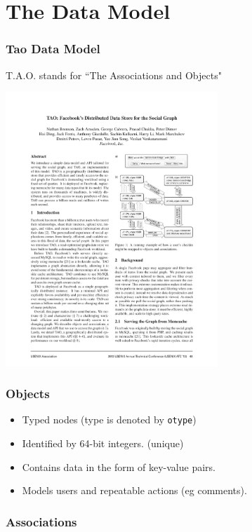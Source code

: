 \section{The Data Model}

\begin{frame}
\frametitle{Tao Data Model}
 	T.A.O. stands for ``The Associations and Objects"
 	\begin{center}
 	\includegraphics[width=0.6\textwidth]{figs/social2}		
 	\end{center}
\end{frame}

\begin{frame}[fragile]
\frametitle{Objects}
   
\begin{itemize}
	\item Typed nodes (type is denoted by \verb|otype|)
	\item Identified by 64-bit integers. (unique) 
	\item Contains data in the form of key-value pairs.
	\item Models users and repeatable actions (eg comments).
\end{itemize}
 


\end{frame}


\begin{frame}
\frametitle{Associations}
    


\end{frame}